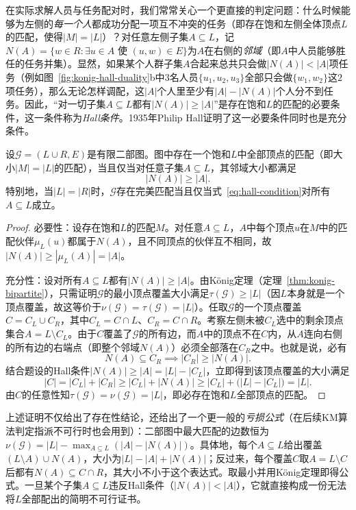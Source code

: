 在实际求解人员与任务配对时，我们常常关心一个更直接的判定问题：什么时候能够为左侧的\emph{每一个人}都成功分配一项互不冲突的任务（即存在饱和左侧全体顶点$L$的匹配，使得$|M|=|L|$）？对任意左侧子集$A\subseteq L$，记$N(A)=\{w\in R:\exists u\in A\text{ 使 }(u,w)\in E\}$为$A$在右侧的\emph{邻域}（即$A$中人员能够胜任的任务并集）。显然，如果某个人群子集$A$合起来总共只会做$|N(A)|<|A|$项任务（例如图~\ref{fig:konig-hall-duality}b中$3$名人员$\{u_1,u_2,u_3\}$全部只会做$\{w_1,w_2\}$这$2$项任务），那么无论怎样调配，这$|A|$个人里至少有$|A|-|N(A)|$个人分不到任务。因此，“对一切子集$A\subseteq L$都有$|N(A)|\geq |A|$”是存在饱和$L$的匹配的必要条件，这一条件称为\emph{Hall条件}。1935年Philip Hall证明了这一必要条件同时也是充分条件。

\begin{theorem}[Hall婚姻定理]
\label{thm:hall-marriage}
设$\mathcal G=(L\cup R,E)$是有限二部图。图中存在一个饱和$L$中全部顶点的匹配（即大小$|M|=|L|$的匹配），当且仅当对任意子集$A\subseteq L$，其邻域大小都满足
\begin{equation}
  |N(A)| \geq |A|.
  \label{eq:hall-condition}
\end{equation}
特别地，当$|L|=|R|$时，$\mathcal G$存在完美匹配当且仅当式~\eqref{eq:hall-condition}对所有$A\subseteq L$成立。
\end{theorem}

\begin{proof}
必要性：设存在饱和$L$的匹配$M$。对任意$A\subseteq L$，$A$中每个顶点$u$在$M$中的匹配伙伴$\mu_L(u)$都属于$N(A)$，且不同顶点的伙伴互不相同，故$|N(A)|\geq |\mu_L(A)|=|A|$。

充分性：设对所有$A\subseteq L$都有$|N(A)|\geq |A|$。由König定理（定理~\ref{thm:konig-bipartite}），只需证明$\mathcal G$的最小顶点覆盖大小满足$\tau(\mathcal G)\geq |L|$（因$L$本身就是一个顶点覆盖，故这等价于$\nu(\mathcal G)=\tau(\mathcal G)=|L|$）。任取$\mathcal G$的一个顶点覆盖$C=C_L\cup C_R$，其中$C_L=C\cap L$、$C_R=C\cap R$。考察左侧未被$C_L$选中的剩余顶点集合$A = L\setminus C_L$。由于$C$覆盖了$\mathcal G$的所有边，而$A$中的顶点不在$C$内，从$A$连向右侧的所有边的右端点（即整个邻域$N(A)$）必须全部落在$C_R$之中。也就是说，必有
\[
  N(A) \subseteq C_R \implies |C_R| \geq |N(A)|.
\]
结合题设的Hall条件$|N(A)|\geq |A|=|L|-|C_L|$，立即得到该顶点覆盖的大小满足
\[
  |C| = |C_L| + |C_R| \geq |C_L| + |N(A)| \geq |C_L| + \bigl(|L| - |C_L|\bigr) = |L|.
\]
由$C$的任意性知$\tau(\mathcal G)=\nu(\mathcal G)=|L|$，即必存在饱和$L$全部顶点的匹配。
\end{proof}

上述证明不仅给出了存在性结论，还给出了一个更一般的\emph{亏损公式}（在后续KM算法判定指派不可行时也会用到）：二部图中最大匹配的边数恒为$\nu(\mathcal G)=|L|-\max_{A\subseteq L}(|A|-|N(A)|)$。具体地，每个$A\subseteq L$给出覆盖$(L\setminus A)\cup N(A)$，大小为$|L|-|A|+|N(A)|$；反过来，每个覆盖$C$取$A=L\setminus C$后都有$N(A)\subseteq C\cap R$，其大小不小于这个表达式。取最小并用König定理即得公式。一旦某个子集$A\subseteq L$违反Hall条件（$|N(A)|<|A|$），它就直接构成一份无法将$L$全部配出的简明不可行证书。

